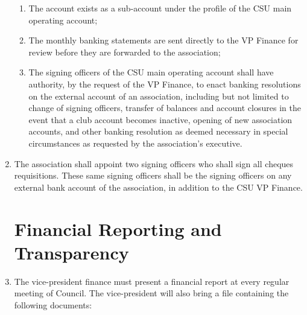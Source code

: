 \documentclass[oneside]{book}
\begin{document}
\begin{enumerate}
\begin{enumerate}
\item The account exists as a sub-account under the profile of the CSU main
operating account; 
\item The monthly banking statements are sent directly to the VP Finance
for review before they are forwarded to the association; 
\item The signing officers of the CSU main operating account shall have
authority, by the request of the VP Finance, to enact banking resolutions
on the external account of an association, including but not limited
to change of signing officers, transfer of balances and account closures
in the event that a club account becomes inactive, opening of new
association accounts, and other banking resolution as deemed necessary
in special circumstances as requested by the association's executive. 
\end{enumerate}
\item The association shall appoint two signing officers who shall sign
all cheques requisitions. These same signing officers shall be the
signing officers on any external bank account of the association,
in addition to the CSU VP Finance. 

\chapter{\label{Financial_Reporting_and_Transparency}Financial Reporting
and Transparency }
\item The vice-president finance must present a financial report at every
regular meeting of Council. The vice-president will also bring a file
containing the following documents: 


\end{enumerate}
\end{document}
